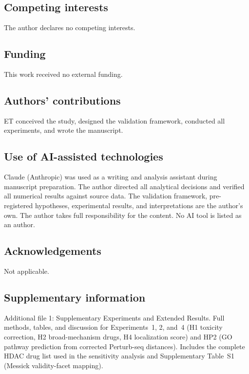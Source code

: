 \documentclass[11pt]{article}
\begin{document}
\subsection*{Competing interests}
The author declares no competing interests.

\subsection*{Funding}
This work received no external funding.

\subsection*{Authors' contributions}
ET conceived the study, designed the validation framework, conducted
all experiments, and wrote the manuscript.

\subsection*{Use of AI-assisted technologies}
Claude (Anthropic) was used as a writing and analysis assistant during
manuscript preparation. The author directed all analytical decisions and
verified all numerical results against source data. The validation framework,
pre-registered hypotheses, experimental results, and interpretations are
the author's own. The author takes full responsibility for the content.
No AI tool is listed as an author.

\subsection*{Acknowledgements}
Not applicable.

\subsection*{Supplementary information}
Additional file 1: Supplementary Experiments and Extended Results.
Full methods, tables, and discussion for Experiments~1, 2, and~4
(H1 toxicity correction, H2 broad-mechanism drugs, H4 localization
score) and HP2 (GO pathway prediction from corrected Perturb-seq
distances). Includes the complete HDAC drug list used in the
sensitivity analysis and Supplementary Table~S1 (Messick validity-facet
mapping).



\end{document}
